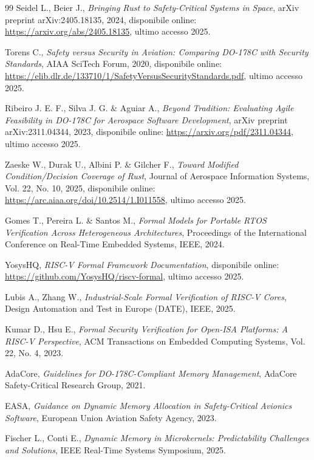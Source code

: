 \documentclass[italian, Lau, oneside]{sapthesis} %
\begin{document}
\begin{thebibliography}{99}
Seidel L., Beier J., \textit{Bringing Rust to Safety-Critical Systems in Space}, arXiv preprint arXiv:2405.18135, 2024, disponibile online: \url{https://arxiv.org/abs/2405.18135}, ultimo accesso 2025.

Torens C., \textit{Safety versus Security in Aviation: Comparing DO-178C with Security Standards}, AIAA SciTech Forum, 2020, disponibile online: \url{https://elib.dlr.de/133710/1/SafetyVersusSecurityStandards.pdf}, ultimo accesso 2025.

Ribeiro J. E. F., Silva J. G. \& Aguiar A., \textit{Beyond Tradition: Evaluating Agile Feasibility in DO-178C for Aerospace Software Development}, arXiv preprint arXiv:2311.04344, 2023, disponibile online: \url{https://arxiv.org/pdf/2311.04344}, ultimo accesso 2025.

Zaeske W., Durak U., Albini P. \& Gilcher F., \textit{Toward Modified Condition/Decision Coverage of Rust}, Journal of Aerospace Information Systems, Vol. 22, No. 10, 2025, disponibile online: \url{https://arc.aiaa.org/doi/10.2514/1.I011558}, ultimo accesso 2025.

Gomes T., Pereira L. \& Santos M., \textit{Formal Models for Portable RTOS Verification Across Heterogeneous Architectures}, Proceedings of the International Conference on Real-Time Embedded Systems, IEEE, 2024.

YosysHQ, \textit{RISC-V Formal Framework Documentation}, disponibile online: \url{https://github.com/YosysHQ/riscv-formal}, ultimo accesso 2025.

Lubis A., Zhang W., \textit{Industrial-Scale Formal Verification of RISC-V Cores}, Design Automation and Test in Europe (DATE), IEEE, 2025.

Kumar D., Hsu E., \textit{Formal Security Verification for Open-ISA Platforms: A RISC-V Perspective}, ACM Transactions on Embedded Computing Systems, Vol. 22, No. 4, 2023.

AdaCore, \textit{Guidelines for DO-178C-Compliant Memory Management}, AdaCore Safety-Critical Research Group, 2021.

EASA, \textit{Guidance on Dynamic Memory Allocation in Safety-Critical Avionics Software}, European Union Aviation Safety Agency, 2023.

Fischer L., Conti E., \textit{Dynamic Memory in Microkernels: Predictability Challenges and Solutions}, IEEE Real-Time Systems Symposium, 2025.


\end{thebibliography}
\end{document}
